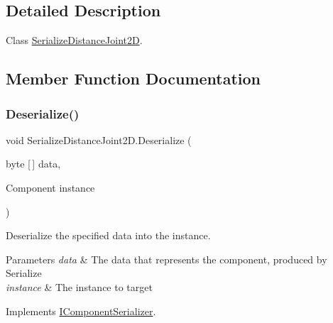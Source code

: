 \subsection{Detailed Description}
Class \hyperlink{class_serialize_distance_joint2_d}{Serialize\+Distance\+Joint2D}. 



\subsection{Member Function Documentation}
\mbox{\label{class_serialize_distance_joint2_d_a0b7341e25aba6354afa746c912bb20f5}} 
\subsubsection{\texorpdfstring{Deserialize()}{Deserialize()}}
{\footnotesize\ttfamily void Serialize\+Distance\+Joint2\+D.\+Deserialize (\begin{DoxyParamCaption}\item[{byte \mbox{[}$\,$\mbox{]}}]{data,  }\item[{Component}]{instance }\end{DoxyParamCaption})\hspace{0.3cm}{\ttfamily [inline]}}



Deserialize the specified data into the instance. 


\begin{DoxyParams}{Parameters}
{\em data} & The data that represents the component, produced by Serialize\\
\hline
{\em instance} & The instance to target\\
\hline
\end{DoxyParams}


Implements \hyperlink{interface_i_component_serializer_a4cc366a5c78b33d47a90c209d8fed883}{I\+Component\+Serializer}.

\mbox{\label{class_serialize_distance_joint2_d_a5eecfd9c48d46eb25958ffb301924b3b}} 
